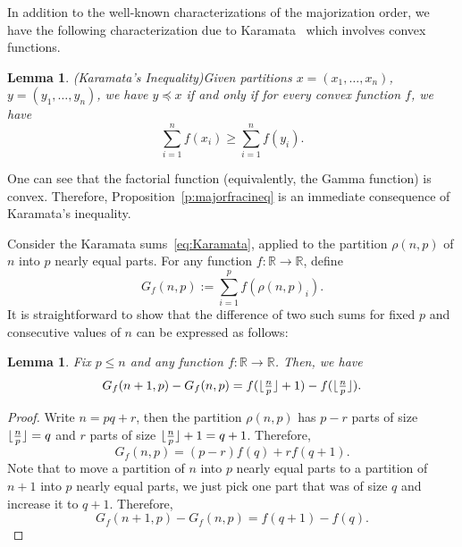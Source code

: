 \documentclass[12pt]{amsart}
\DeclarePairedDelimiter\floor{\lfloor}{\rfloor}
\newtheorem{lem}[thm]{Lemma}
\theoremstyle{definition}
\numberwithin{equation}{section}
\newcommand{\defeq}{:=}
\begin{document}
In addition to the well-known characterizations of the majorization order, we have the following characterization
due to Karamata~\cite[p.~3--13]{MOA2011}
which involves
convex functions.

\begin{lem}(Karamata's Inequality)\label{l:Karamata}
    Given partitions $x=(x_1,\dotsc,x_n)$,
    $y=(y_1,\dotsc,y_n)$,
    we have $y \preceq x$ if and only if for every convex function $f$, we have
    \begin{equation}\label{eq:Karamata}
        \sum_{i=1}^n f(x_i) \geq \sum_{i=1}^n f(y_i).
    \end{equation}
\end{lem}

One can see that the factorial function (equivalently, the Gamma function) is convex. Therefore, Proposition~\ref{p:majorfracineq} is an immediate consequence of Karamata’s inequality.

Consider the Karamata sums~\eqref{eq:Karamata}, applied to the partition $\rho(n,p)$ of $n$ into $p$ nearly equal parts. For any function $f: \mathbb R \rightarrow \mathbb R$, define
\begin{equation}\label{eq:Gdef}
        G_f(n,p) \defeq \sum_{i=1}^{p} f(\rho(n,p)_i).
    \end{equation}
    It is straightforward to show that the difference of two such sums for fixed $p$ and consecutive values of $n$ can be expressed as follows:

\begin{lem}\label{l:G function 1}
    Fix $p \leq n$ and any function $f: \mathbb R \rightarrow \mathbb R$.
    Then, we have
    \begin{equation}\label{eq:G function 1}
        G_f(n+1,p) - G_f(n,p) = f(\floor{\tfrac{n}{p}}+1) - f(\floor{\tfrac{n}{p}}).
    \end{equation}
\end{lem}

\begin{proof}
    Write $n=pq +r$, then the partition $\rho(n,p)$ has $p-r$ parts of size $\floor{\tfrac{n}{p}} = q$ and $r$ parts of size $\floor{\tfrac{n}{p}}+1 = q+1$. Therefore, \begin{equation*}
        G_f(n,p) = (p-r)f(q) + r f(q+1).
    \end{equation*} Note that to move a partition of $n$ into $p$ nearly equal parts to a partition of $n+1$ into $p$ nearly equal parts, we just pick one part that was of size $q$ and increase it to $q+1$. Therefore, \begin{equation*}
        G_f(n+1,p) - G_f(n,p) = f(q+1) - f(q).
        \end{equation*}
\end{proof}
\end{document}
